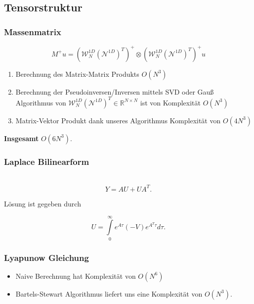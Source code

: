 \subsection{Tensorstruktur}

\begin{frame}
\frametitle{Massenmatrix}
\begin{framed}
\begin{equation*}
M^+ u =(\mathcal{W}_N^{1D} (\mathcal{N}^{1D})^T)^+ \otimes  (\mathcal{W}_N^{1D} (\mathcal{N}^{1D})^T)^+  u
\end{equation*}
\end{framed}
\begin{enumerate}
\item Berechnung des Matrix-Matrix Produkts $O(N^3)$
\item Berechnung der Pseudoinversen/Inversen mittels SVD oder Gauß Algorithmus von $\mathcal{W}_N^{1D} (\mathcal{N}^{1D})^T \in \mathbb{R}^{N \times N}$ ist von Komplexität $O(N^3)$
\item Matrix-Vektor Produkt dank unseres Algorithmus Komplexität von $O(4N^3)$
\end{enumerate}
\textbf{Insgesamt} $O(6N^3)$.
\end{frame}

\begin{frame}
\frametitle{Laplace Bilinearform}
\begin{framed}
 \\
\begin{equation*}
Y=AU+UA^T.
\end{equation*}
\end{framed}
Lösung ist gegeben durch

\begin{framed}
\begin{equation*}
U = \int\limits_{0}^{\infty} e^{A \tau} (-V) e^{A^T \tau} d\tau.
\end{equation*}
\end{framed}
\end{frame}

\begin{frame}
\frametitle{Lyapunow Gleichung}
\begin{itemize}
\item Naive Berechnung hat Komplexität von $O(N^6)$
\item Bartels-Stewart Algorithmus \cite{Bartels} liefert uns eine Komplexität von $O(N^3)$.
\end{itemize}
\end{frame}